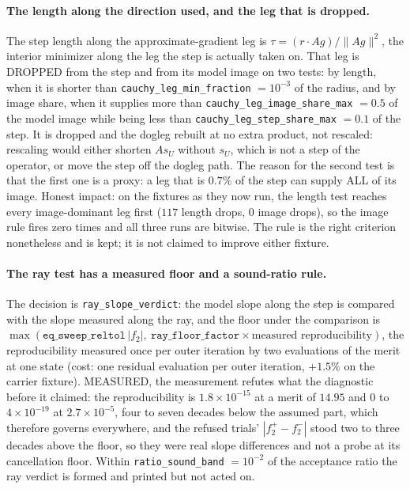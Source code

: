 \documentclass[english,a4paper]{my_memo}
\newcommand{\code}[1]{\texttt{#1}}
\begin{document}
\paragraph{The length along the direction used, and the leg that is dropped.}
The step length along the approximate-gradient leg is
$\tau = (r \cdot Ag)/\|Ag\|^{2}$, the interior minimizer along the leg the
step is actually taken on. That leg is DROPPED from the step and from its
model image on two tests: by length, when it is shorter than
\code{cauchy\_leg\_min\_fraction} $= 10^{-3}$ of the radius, and by image
share, when it supplies more than \code{cauchy\_leg\_image\_share\_max} $=
0.5$ of the model image while being less than
\code{cauchy\_leg\_step\_share\_max} $= 0.1$ of the step. It is dropped and
the dogleg rebuilt at no extra product, not rescaled: rescaling would either
shorten $A s_U$ without $s_U$, which is not a step of the operator, or move
the step off the dogleg path. The reason for the second test is that the
first one is a proxy: a leg that is $0.7\%$ of the step can supply ALL of its
image. Honest impact: on the fixtures as they now run, the length test
reaches every image-dominant leg first ($117$ length drops, $0$ image drops),
so the image rule fires zero times and all three runs are bitwise. The rule
is the right criterion nonetheless and is kept; it is not claimed to improve
either fixture.

\paragraph{The ray test has a measured floor and a sound-ratio rule.} The
decision is \code{ray\_slope\_verdict}: the model slope along the step is
compared with the slope measured along the ray, and the floor under the
comparison is
$\max(\code{eq\_sweep\_reltol}\,|f_2|,\ \code{ray\_floor\_factor}\times
\text{measured reproducibility})$, the reproducibility measured once per
outer iteration by two evaluations of the merit at one state (cost: one
residual evaluation per outer iteration, $+1.5\%$ on the carrier fixture).
MEASURED, the measurement refutes what the diagnostic before it claimed: the
reproducibility is $1.8\times10^{-15}$ at a merit of $14.95$ and $0$ to
$4\times10^{-19}$ at $2.7\times10^{-5}$, four to seven decades below the
assumed part, which therefore governs everywhere, and the refused trials'
$|f_{2}^{+} - f_{2}^{-}|$ stood two to three decades above the floor, so they
were real slope differences and not a probe at its cancellation floor.
Within \code{ratio\_sound\_band} $= 10^{-2}$ of the acceptance ratio the ray
verdict is formed and printed but not acted on.
\end{document}
